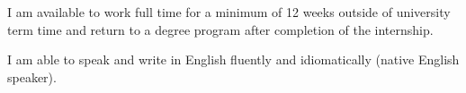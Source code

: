 

\begin{cventries}
\vspace{-0.8cm}
  \cventry
    {} %
    {} %
    {} %
    {} %
    {
    \begin{cvitems}
    \item {I am available to work full time for a minimum of 12 weeks outside of university term time and return to a degree program after completion of the internship.}
    \item {I am able to speak and write in English fluently and idiomatically (native English speaker).}
    \end{cvitems}
    }

\end{cventries}


